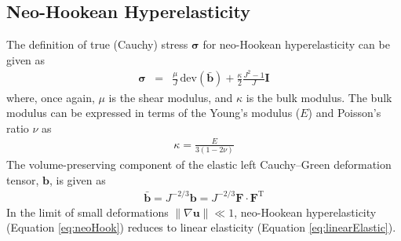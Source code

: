 \documentclass[sn-mathphys,Numbered]{sn-jnl}%
\newcommand{\bb}{\boldsymbol}
\begin{document}
\begin{appendices}
\subsection{Neo-Hookean Hyperelasticity}
The definition of true (Cauchy) stress $\bb{\sigma}$ for neo-Hookean hyperelasticity can be given as
\begin{eqnarray} \label{eq:neoHook}
	\bb{\sigma}
	&=& \frac{\mu}{J} \, \text{dev} \left( \bar{\bb{b}} \right) + \frac{\kappa}{2} \frac{J^2 - 1}{J} \textbf{I}
\end{eqnarray}
where, once again, $\mu$ is the shear modulus, and $\kappa$ is the bulk modulus.
The bulk modulus can be expressed in terms of the Young's modulus ($E$) and Poisson's ratio $\nu$ as
\begin{eqnarray}
	\kappa = \frac{E}{3(1 - 2\nu)}
\end{eqnarray}
The volume-preserving component of the elastic left Cauchy--Green deformation tensor, $\boldsymbol{b}$, is given as
\begin{eqnarray}
	\bar{\bb{b}} = J^{-2/3} \bb{b} = J^{-2/3} \bb{F} \cdot \bb{F}^{\text{T}}
\end{eqnarray}
In the limit of small deformations $\lVert \nabla \mathbf{u} \rVert  \ll 1$, neo-Hookean hyperelasticity (Equation \ref{eq:neoHook}) reduces to linear elasticity (Equation \ref{eq:linearElastic}).


\end{appendices}
\end{document}
